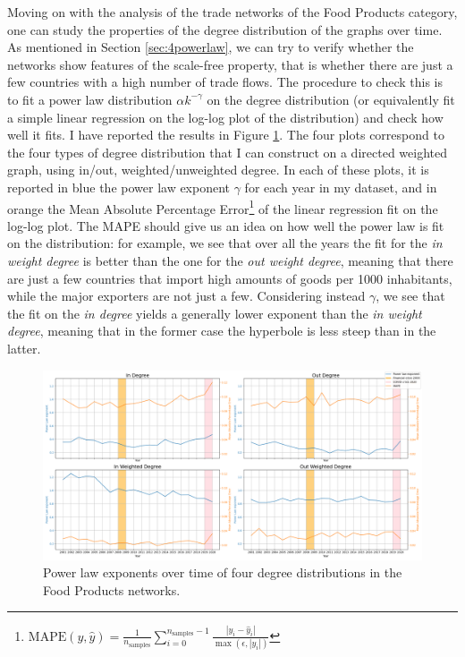 Moving on with the analysis of the trade networks of the Food Products category, one can study the properties of the degree distribution of the graphs over time. As mentioned in Section \ref{sec:4powerlaw}, we can try to verify whether the networks show features of the scale-free property, that is whether there are just a few countries with a high number of trade flows. The procedure to check this is to fit a power law distribution $\alpha k^{-\gamma}$ on the degree distribution (or equivalently fit a simple linear regression on the log-log plot of the distribution) and check how well it fits. I have reported the results in Figure \ref{fig:fooddegree}. The four plots correspond to the four types of degree distribution that I can construct on a directed weighted graph, using in/out, weighted/unweighted degree. In each of these plots, it is reported in blue the power law exponent $\gamma$ for each year in my dataset, and in orange the Mean Absolute Percentage Error\footnote{
    $\text{MAPE}(y, \hat{y}) = \frac{1}{n_{\text{samples}}} \sum_{i=0}^{n_{\text{samples}}-1} \frac{{}\left| y_i - \hat{y}_i \right|}{\max(\epsilon, \left| y_i \right|)}$
} of the linear regression fit on the log-log plot. The MAPE should give us an idea on how well the power law is fit on the distribution: for example, we see that over all the years the fit for the \textit{in weight degree} is better than the one for the \textit{out weight degree}, meaning that there are just a few countries that import high amounts of goods per 1000 inhabitants, while the major exporters are not just a few. Considering instead $\gamma$, we see that the fit on the \textit{in degree} yields a generally lower exponent than the \textit{in weight degree}, meaning that in the former case the hyperbole is less steep than in the latter. 
\begin{figure}
    \centering
    \includegraphics[width=\textwidth]{pics/ts_p10.png}
    \caption{Power law exponents over time of four degree distributions in the Food Products networks.}
    \label{fig:fooddegree}
\end{figure}
